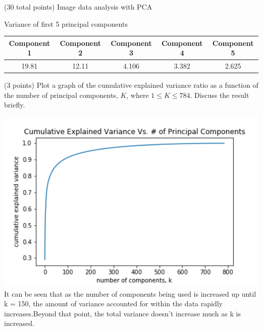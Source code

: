\documentclass[12pt]{article}
\begin{document}
\begin{question}{(30 total points) Image data analysis with PCA}
\begin{subquestion}
    \begin{answerbox}{15em}
    \begin{center}
    \caption{Variance of first 5 principal components}\newline
    \begin{tabular}{c|c|c|c|c}
    \hline
    Component 1 & Component 2 & Component 3 & Component 4 & Component 5 \\ \hline
    19.81 & 12.11 & 4.106 & 3.382 & 2.625 \\
    \hline
    \end{tabular}
    \end{center}
      
    \end{answerbox}
    


   \end{subquestion}

   \begin{subquestion}{(3 points)
       Plot a graph of the cumulative explained variance ratio as a
       function of the number of principal components, $K$, where $1
       \le K \le 784$.
       Discuss the result briefly.
     } \label{Q1.plot.pca.variance}
   

      \begin{answerbox}{30em}
        \includegraphics[width = 1.0\textwidth]{q1_4.png}
        It can be seen that as the number of components being used is increased up until k = 150, the amount of variance accounted for within the data rapidly increases.Beyond that point, the total variance doesn't increase much as k is increased.
    
      \end{answerbox}
  



\end{subquestion}
\end{question}
\end{document}
